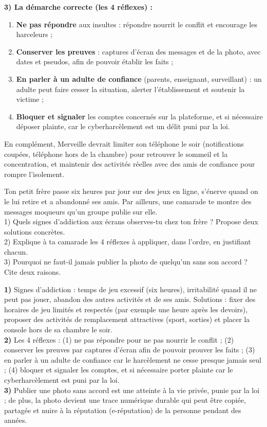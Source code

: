 \documentclass[11pt]{article}
\begin{document}
\begin{exoresolu}
\textbf{3) La démarche correcte (les 4 réflexes) :}
\begin{enumerate}
  \item \textbf{Ne pas répondre} aux insultes : répondre nourrit le conflit et encourage les harceleurs ;
  \item \textbf{Conserver les preuves} : captures d'écran des messages et de la photo, avec dates et pseudos, afin de pouvoir établir les faits ;
  \item \textbf{En parler à un adulte de confiance} (parents, enseignant, surveillant) : un adulte peut faire cesser la situation, alerter l'établissement et soutenir la victime ;
  \item \textbf{Bloquer et signaler} les comptes concernés sur la plateforme, et si nécessaire déposer plainte, car le cyberharcèlement est un délit puni par la loi.
\end{enumerate}
En complément, Merveille devrait limiter son téléphone le soir (notifications coupées, téléphone hors de la chambre) pour retrouver le sommeil et la concentration, et maintenir des activités réelles avec des amis de confiance pour rompre l'isolement.
\end{exoresolu}

\begin{exercice}
Ton petit frère passe six heures par jour sur des jeux en ligne, s'énerve quand on le lui retire et a abandonné ses amis. Par ailleurs, une camarade te montre des messages moqueurs qu'un groupe publie sur elle.\\[2pt]
1) Quels signes d'addiction aux écrans observes-tu chez ton frère ? Propose deux solutions concrètes.\\
2) Explique à ta camarade les 4 réflexes à appliquer, dans l'ordre, en justifiant chacun.\\
3) Pourquoi ne faut-il jamais publier la photo de quelqu'un sans son accord ? Cite deux raisons.
\end{exercice}

\begin{corrige}[Exercice]
\textbf{1)} Signes d'addiction : temps de jeu excessif (six heures), irritabilité quand il ne peut pas jouer, abandon des autres activités et de ses amis. Solutions : fixer des horaires de jeu limités et respectés (par exemple une heure après les devoirs), proposer des activités de remplacement attractives (sport, sorties) et placer la console hors de sa chambre le soir.\\[3pt]
\textbf{2)} Les 4 réflexes : (1) ne pas répondre pour ne pas nourrir le conflit ; (2) conserver les preuves par captures d'écran afin de pouvoir prouver les faits ; (3) en parler à un adulte de confiance car le harcèlement ne cesse presque jamais seul ; (4) bloquer et signaler les comptes, et si nécessaire porter plainte car le cyberharcèlement est puni par la loi.\\[3pt]
\textbf{3)} Publier une photo sans accord est une atteinte à la vie privée, punie par la loi ; de plus, la photo devient une trace numérique durable qui peut être copiée, partagée et nuire à la réputation (e-réputation) de la personne pendant des années.
\end{corrige}
\end{document}
